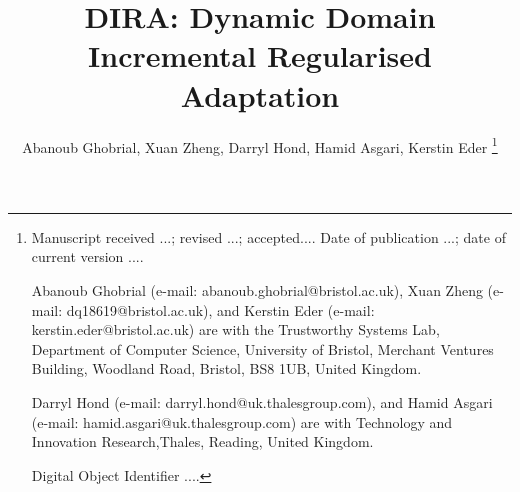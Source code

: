 \documentclass[letterpaper, 10 pt, journal, twoside]{IEEEtran}
\begin{document}
\title{\textbf{DIRA}: \textbf{D}ynamic Domain \textbf{I}ncremental \textbf{R}egularised \textbf{A}daptation}

\author{Abanoub Ghobrial, Xuan Zheng, Darryl Hond, Hamid Asgari, Kerstin Eder 
\thanks{{\footnotesize
Manuscript  
received ...;
revised ...;  
accepted.... 
Date of publication ...;
date of current version ....



Abanoub Ghobrial (e-mail: abanoub.ghobrial@bristol.ac.uk), 
Xuan Zheng (e-mail: dq18619@bristol.ac.uk), 
and 
Kerstin Eder (e-mail: kerstin.eder@bristol.ac.uk) 
are with the Trustworthy Systems Lab, Department of Computer Science, University of Bristol, Merchant Ventures Building, Woodland Road, Bristol, BS8 1UB, United Kingdom. 

Darryl Hond (e-mail: darryl.hond@uk.thalesgroup.com),
and
Hamid Asgari (e-mail: hamid.asgari@uk.thalesgroup.com) 
are with Technology and Innovation Research,Thales, Reading, United Kingdom. 

Digital Object Identifier ....
}}}
%
%
\maketitle

\begin{abstract}
\noindent 

\end{abstract}
\end{document}
